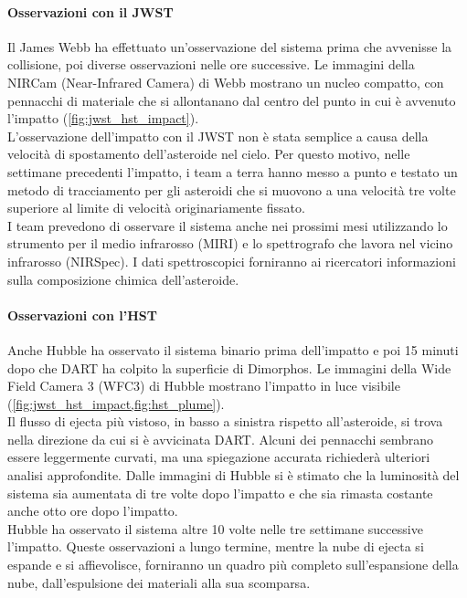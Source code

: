 \documentclass[a4paper,11pt,openright]{book}
\begin{document}
\paragraph*{Osservazioni con il JWST}
Il James Webb ha effettuato un'osservazione del sistema prima che avvenisse la collisione, poi diverse osservazioni nelle ore successive. Le immagini della NIRCam (Near-Infrared Camera) di Webb mostrano un nucleo compatto, con pennacchi di materiale che si allontanano dal centro del punto in cui è avvenuto l'impatto (\cref{fig:jwst_hst_impact}).\\
L'osservazione dell'impatto con il JWST non è stata semplice a causa della velocità di spostamento dell'asteroide nel cielo. Per questo motivo, nelle settimane precedenti l'impatto, i team a terra hanno messo a punto e testato un metodo di tracciamento per gli asteroidi che si muovono a una velocità tre volte superiore al limite di velocità originariamente fissato.\\
I team prevedono di osservare il sistema anche nei prossimi mesi utilizzando lo strumento per il medio infrarosso (MIRI) e lo spettrografo che lavora nel vicino infrarosso (NIRSpec). I dati spettroscopici forniranno ai ricercatori informazioni sulla composizione chimica dell'asteroide.

\paragraph*{Osservazioni con l'HST}
Anche Hubble ha osservato il sistema binario prima dell'impatto e poi 15 minuti dopo che DART ha colpito la superficie di Dimorphos. Le immagini della Wide Field Camera 3 (WFC3) di Hubble mostrano l'impatto in luce visibile (\cref{fig:jwst_hst_impact,fig:hst_plume}).\\
Il flusso di ejecta più vistoso, in basso a sinistra rispetto all'asteroide, si trova nella direzione da cui si è avvicinata DART. Alcuni dei pennacchi sembrano essere leggermente curvati, ma una spiegazione accurata richiederà ulteriori analisi approfondite. Dalle immagini di Hubble si è stimato che la luminosità del sistema sia aumentata di tre volte dopo l'impatto e che sia rimasta costante anche otto ore dopo l'impatto.\\
Hubble ha osservato il sistema altre 10 volte nelle tre settimane successive l'impatto. Queste osservazioni a lungo termine, mentre la nube di ejecta si espande e si affievolisce, forniranno un quadro più completo sull'espansione della nube, dall'espulsione dei materiali alla sua scomparsa.
\end{document}
